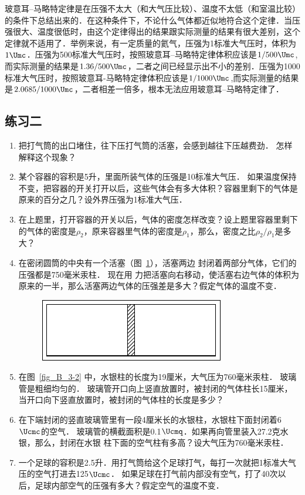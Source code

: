 玻意耳--马略特定律是在压强不太大（和大气压比较）、温度不太低（和室温比较）的条件下总结出来的．在这种条件下，不论什么气体都近似地符合这个定律．当压强很大、温度很低时，由这个定律得出的结果跟实际测量的结果有很大差别，这个定律就不适用了．举例来说，有一定质量的氦气，压强为1标准大气压时，体积为$1\Umc$．压强为500标准大气压时，按照玻意耳--马略特定律体积应该是$1/500 \Umc $,而实际测量的结果是$1.36/500\Umc$，二者之间已经显示出不小的差别．压强为1000标准大气压时，按照玻意耳-马略特定律体积应该是$1/1000\Umc$,而实际测量的结果是$2.0685/1000\Umc$，二者相差一倍多，根本无法应用玻意耳--马略特定律了．


\subsection*{练习二}
\begin{enumerate}
    \item 把打气筒的出口堵住，往下压打气筒的活塞，会感到越往下压越费劲．
    怎样解释这个现象？
    \item 某个容器的容积是5升，里面所装气体的压强是10标准大气压．
    如果温度保持不变，把容器的开关打开以后，这些气体会有多大体积？容器里剩下的气体是原来的百分之几？设外界压强为1标准大气压．
    \item 在上题里，打开容器的开关以后，气体的密度怎样改变？设上题里容器里剩下的气体的密度是$\rho_2$，原来容器里气体的密度是$\rho_1$，那么，密度之比$\rho_2/\rho_1$是多大？
    \item 在密闭圆筒的中央有一个活塞（图~\ref{fig_B_3-8}），活塞两边
    封闭着两部分气体，它们的压强都是750毫米汞柱．
    现在用
    力把活塞向右移动，使活塞右边气体的体积为原来的一半，那么活塞两边气体的压强差是多大？假定气体的温度不变．
\begin{figure}[htbp]
    \centering
    \includegraphics{fig/B/3-8.pdf}
    \caption{}\label{fig_B_3-8}
\end{figure}

    \item 在图~\ref{fig_B_3-2} 中，水银柱的长度为19厘米，大气压为760毫米汞柱．
    玻璃管是粗细均匀的．
    玻璃管开口向上竖直放置时，被封闭的气体柱长15厘米，当开口向下竖直放置时，被封闭的气体柱的长度是多少？
    \item 在下端封闭的竖直玻璃管里有一段4厘米长的水银柱，水银柱下面封闭着6$\Ucmc$的空气．
    玻璃管的横截面积是0.1$\Ucmq$．如果再向管里装入27.2克水银，那么，封闭在水银
 柱下面的空气柱有多高？设大气压为760毫米汞柱．
    \item 一个足球的容积是2.5升．用打气筒给这个足球打气，每打一次就把1标准大气压的空气打进去125$\Ucmc$．
    如果足球在打气前内部没有空气，打了40次以后，足球内部空气的压强有多大？假定空气的温度不变．
\end{enumerate}

